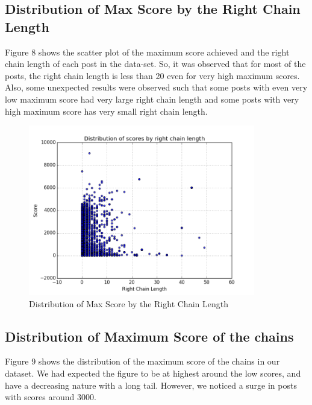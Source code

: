 \documentclass{article} %
\begin{document}
\newpage

\subsection{Distribution of Max Score by the Right Chain Length}

Figure 8 shows the scatter plot of the maximum score achieved and the right chain length of each post in the data-set. So, it was observed that for most of the posts, the right chain length is less than 20 even for very high maximum scores. Also, some unexpected results were observed such that some posts with even very low maximum score had very large right chain length and some posts with very high maximum score has very small right chain length.

\begin{figure}[h]
\begin{center}
\includegraphics[width=3.9in]{score_right_chain.png}
\caption{Distribution of Max Score by the Right Chain Length}
\end{center}
\end{figure}

\subsection{Distribution of Maximum Score of the chains}

Figure 9 shows the distribution of the maximum score of the chains in our dataset. We had expected the figure to be at highest around the low scores, and have a decreasing nature with a long tail. However, we noticed a surge in posts with scores around 3000.
\end{document}
